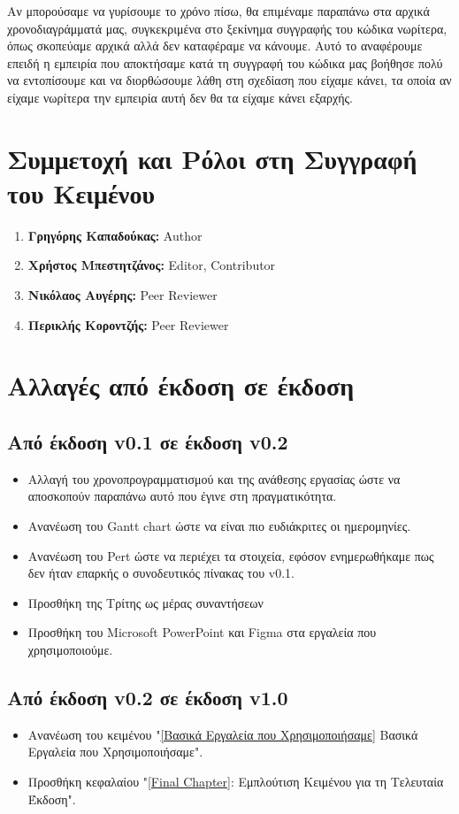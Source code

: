 \documentclass[12pt,a4paper]{article}
\begin{document}
Αν μπορούσαμε να γυρίσουμε το χρόνο πίσω, θα επιμέναμε παραπάνω στα αρχικά χρονοδιαγράμματά μας, συγκεκριμένα στο ξεκίνημα συγγραφής του κώδικα νωρίτερα, όπως σκοπεύαμε αρχικά αλλά δεν καταφέραμε να κάνουμε. Αυτό το αναφέρουμε επειδή η εμπειρία που αποκτήσαμε κατά τη συγγραφή του κώδικα μας βοήθησε πολύ να εντοπίσουμε και να διορθώσουμε λάθη στη σχεδίαση που είχαμε κάνει, τα οποία αν είχαμε νωρίτερα την εμπειρία αυτή δεν θα τα είχαμε κάνει εξαρχής.


\section{Συμμετοχή και Ρόλοι στη Συγγραφή του Κειμένου}
\begin{enumerate}
	\item \textbf{Γρηγόρης Καπαδούκας:} Author
	\item \textbf{Χρήστος Μπεστητζάνος:} Editor, Contributor
	\item \textbf{Νικόλαος Αυγέρης:} Peer Reviewer
	\item \textbf{Περικλής Κοροντζής:} Peer Reviewer
\end{enumerate}

\section{Αλλαγές από έκδοση σε έκδοση}

\subsection{Από έκδοση v0.1 σε έκδοση v0.2}
\begin{itemize}
    \item Αλλαγή του χρονοπρογραμματισμού και της ανάθεσης εργασίας ώστε να αποσκοπούν παραπάνω αυτό που έγινε στη πραγματικότητα.
    \item Ανανέωση του Gantt chart ώστε να είναι πιο ευδιάκριτες οι ημερομηνίες.
    \item Ανανέωση του Pert ώστε να περιέχει τα στοιχεία, εφόσον ενημερωθήκαμε πως δεν ήταν επαρκής ο συνοδευτικός πίνακας του v0.1.
    \item Προσθήκη της Τρίτης ως μέρας συναντήσεων
    \item Προσθήκη του Microsoft PowerPoint και Figma στα εργαλεία που χρησιμοποιούμε.
\end{itemize}

\subsection{Από έκδοση v0.2 σε έκδοση v1.0}
\begin{itemize}
    \item Ανανέωση του κειμένου "\ref{Βασικά Εργαλεία που Χρησιμοποιήσαμε} Βασικά Εργαλεία που Χρησιμοποιήσαμε".
    \item Προσθήκη κεφαλαίου "\ref{Final Chapter}: Εμπλούτιση Κειμένου για τη Τελευταία Έκδοση".
\end{itemize}
\end{document}
